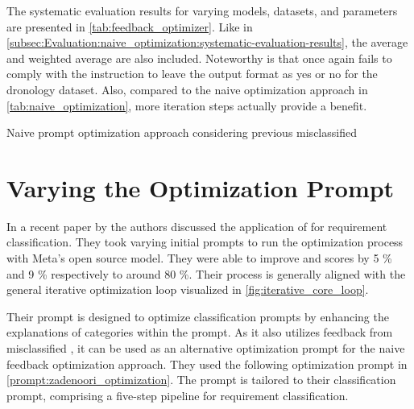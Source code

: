 The systematic evaluation results for varying models, datasets, and parameters are presented in \autoref{tab:feedback_optimizer}.
Like in \autoref{subsec:Evaluation:naive_optimization:systematic-evaluation-results}, the average and weighted average are also included.
Noteworthy is that \llama once again fails to comply with the instruction to leave the output format as \textquotesingle yes \textquotesingle or \textquotesingle no \textquotesingle for the dronology dataset. 
Also, compared to the naive optimization approach in \autoref{tab:naive_optimization}, more iteration steps actually provide a benefit.

\begin{landscape}
    \begin{table}
        \centering
        \renewcommand{\arraystretch}{1}
        
        \renewcommand{\arraystretch}{1}
        \caption{Naive prompt optimization approach considering previous misclassified \TLs}
        \label{tab:feedback_optimizer}
    \end{table}
\end{landscape}


\section{Varying the Optimization Prompt}
\label{sec:Evaluation:varying-the-optimization-prompt}
In a recent paper by  the authors discussed the application of \APE for requirement classification.
They took varying initial prompts to run the optimization process with Meta's open source \llama model.
They were able to improve \fone and \ftwo scores by 5 \% and 9 \% respectively to around 80 \%.
Their \APE process is generally aligned with the general iterative optimization loop visualized in \autoref{fig:iterative_core_loop}.

Their prompt is designed to optimize classification prompts by enhancing the explanations of categories within the prompt.
As it also utilizes feedback from misclassified \TLs, it can be used as an alternative optimization prompt for the naive feedback optimization approach.
They used the following optimization prompt in \autoref{prompt:zadenoori_optimization}.
The prompt is tailored to their \CoT classification prompt, comprising a five-step pipeline for requirement classification.

